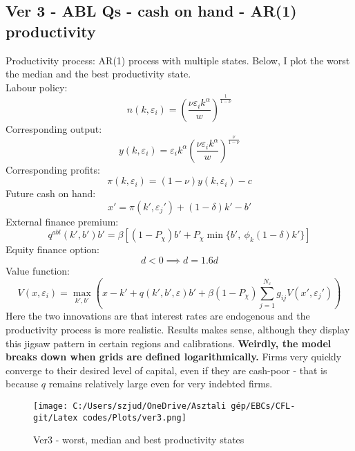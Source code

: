 \documentclass[12pt]{article}
\begin{document}
\newpage
\setcounter{equation}{0}

\subsection*{Ver 3 - ABL Qs - cash on hand - AR(1) productivity}
Productivity process: AR(1) process with multiple states. Below, I plot the worst the median and the best productivity state. \vspace{3mm} \\
Labour policy: 
\begin{equation}
    n(k,\varepsilon_i) = \left( \dfrac{ \nu \varepsilon_i k^\alpha}{w} \right)^{\frac{1}{1-\nu}}
\end{equation}
Corresponding output: 
\begin{equation}
    y(k,\varepsilon_i) = \varepsilon_i k^{\alpha} \left( \dfrac{\nu \varepsilon_i k^\alpha}{w} \right)^{\frac{\nu}{1-\nu}}
\end{equation}
Corresponding profits: 
\begin{equation}
    \pi(k,\varepsilon_i) = (1-\nu) y(k,\varepsilon_i) - c
\end{equation}
Future cash on hand: 
\begin{equation}
   x' = \pi(k',\varepsilon_j')+(1-\delta)k'-b'
\end{equation}
External finance premium:
\begin{equation}
    q^{abl}(k',b')b' = \beta \left[ (1-P_\chi) b' + P_\chi \min\{b', \ \phi_k (1-\delta) k' \} \right]  
\end{equation}
Equity finance option:
\begin{equation}
    d < 0 \implies d = 1.6d
\end{equation}
Value function:
\begin{equation}
     V(x, \varepsilon_i) = \max_{k',b'}  \left( x - k' +  q(k',b',\varepsilon) b' +
            \beta (1-P_\chi) \sum_{j=1}^{N_\varepsilon} g_{ij}  V(x',\varepsilon_j') \right)
\end{equation}
Here the two innovations are that interest rates are endogenous and the productivity process is more realistic. Results makes sense, although they display this jigsaw pattern in certain regions and calibrations. \textbf{Weirdly, the model breaks down when grids are defined logarithmically.} Firms very quickly converge to their desired level of capital, even if they are cash-poor - that is because $q$ remains relatively large even for very indebted firms.

\begin{figure}[H]  %
    \centering
    \caption{Ver3 - worst, median and best productivity states} \label{chart:CFLcdf}
    \texttt{[image: C:/Users/szjud/OneDrive/Asztali gép/EBCs/CFL-git/Latex codes/Plots/ver3.png]}
\end{figure}
\end{document}
